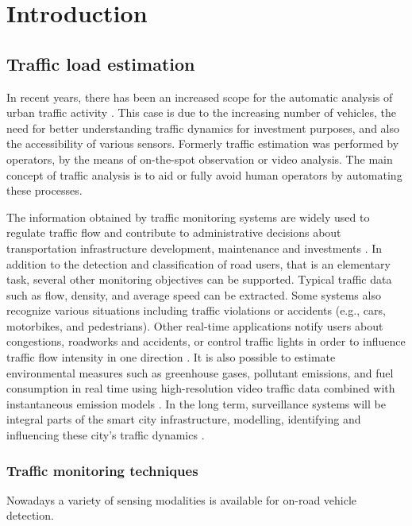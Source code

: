 \renewcommand{\thechapter}{\Alph{chapter}}
\chapter*{Introduction}\label{chap:introduction}\setcounter{chapter}{9} 
\section{Traffic load estimation}
In recent years, there has been an increased scope for the automatic analysis of urban traffic activity \cite{Buch2011}.
This case is due to the increasing number of vehicles, the need for better understanding traffic dynamics for investment purposes, and also the accessibility of various sensors.
Formerly traffic estimation was performed by operators, by the means of on-the-spot observation or video analysis.
The main concept of traffic analysis is to aid or fully avoid human operators by automating these processes.

The information obtained by traffic monitoring systems are widely used to regulate traffic flow and contribute to administrative decisions about transportation infrastructure development, maintenance and investments \cite{MagyarKozut}.
In addition to the detection and classification of road users, that is an elementary task, several other monitoring objectives can be supported. 
Typical traffic data such as flow, density, and average speed can be extracted.
Some systems also recognize various situations including traffic violations or accidents (e.g., cars, motorbikes, and pedestrians).
Other real-time applications notify users about congestions, roadworks and accidents, or control traffic lights in order to influence traffic flow intensity in one direction \cite{AzoSensor, Thiruverahan2015, Ghazal2016}.
It is also possible to estimate environmental measures such as greenhouse gases, pollutant emissions, and fuel consumption in real time using high-resolution video traffic data combined with instantaneous emission models \cite{Morris2012a}. 
In the long term, surveillance systems will be integral parts of the smart city infrastructure, modelling, identifying and influencing these city's traffic dynamics \cite{SOLSUN}.

\subsection{Traffic monitoring techniques}
Nowadays a variety of sensing modalities is available for on-road vehicle detection.

